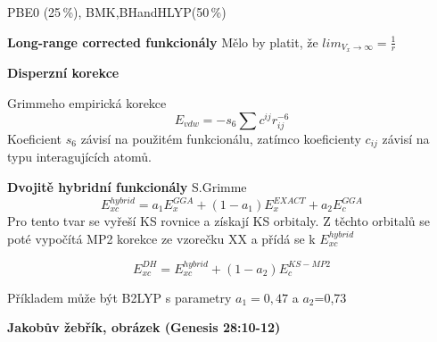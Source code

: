 PBE0 (25\,\%), BMK,BHandHLYP(50\,\%)

\textbf{Long-range corrected funkcionály}
Mělo by platit, že $lim_{V_x\to \infty}=\frac{1}{r}$

\textbf{Disperzní korekce}

Grimmeho empirická korekce
\begin{equation}
E_{vdw}=-s_6\sum c^{ij}r_{ij}^{-6}
\end{equation}
Koeficient $s_6$ závisí na použitém funkcionálu, zatímco koeficienty $c_{ij}$ závisí na typu interagujících atomů.

\textbf{Dvojitě hybridní funkcionály}
S.Grimme 
\begin{equation}
E_{xc}^{hybrid}=a_1E_x^{GGA}+(1-a_1)E_x^{EXACT}+a_2E_c^{GGA}
\end{equation}
Pro tento tvar se vyřeší KS rovnice a získají KS orbitaly. Z těchto orbitalů se poté vypočítá MP2 korekce
ze vzorečku XX a přídá se k $E_{xc}^{hybrid}$

\begin{equation}
E_{xc}^{DH}=E_{xc}^{hybrid}+(1-a_2)E_c^{KS-MP2}
\end{equation}

Příkladem může být B2LYP s parametry $a_1=0,47$ a $a_2$=0,73

\textbf{Jakobův žebřík, obrázek (Genesis 28:10-12)}
